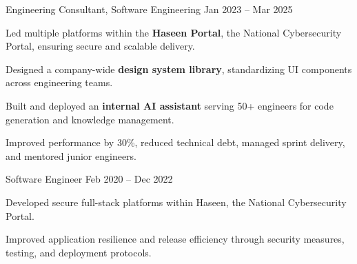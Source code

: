 \begin{cventries}
  \cventry
    {Engineering Consultant, Software Engineering}
    {}
    {Jan 2023 -- Mar 2025}
    {
      \begin{cvitems}
        \item {Led multiple platforms within the \textbf{Haseen Portal}, the National Cybersecurity Portal, ensuring secure and scalable delivery.}
        \item {Designed a company-wide \textbf{design system library}, standardizing UI components across engineering teams.}
        \item {Built and deployed an \textbf{internal AI assistant} serving 50+ engineers for code generation and knowledge management.}
        \item {Improved performance by 30\%, reduced technical debt, managed sprint delivery, and mentored junior engineers.}
      \end{cvitems}
    }

  \cventry
    {Software Engineer}
    {}
    {Feb 2020 -- Dec 2022}
    {
      \begin{cvitems}
        \item {Developed secure full-stack platforms within Haseen, the National Cybersecurity Portal.}
        \item {Improved application resilience and release efficiency through security measures, testing, and deployment protocols.}
      \end{cvitems}
    }

\end{cventries}
